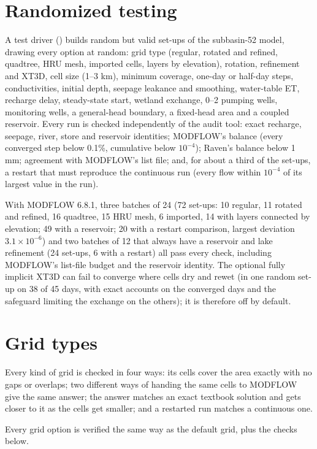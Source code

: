 \section{Randomized testing}\label{sec:fuzz}
A test driver () builds random but valid set-ups of the subbasin-52 model, drawing every option
at random: grid type (regular, rotated and refined, quadtree, HRU mesh, imported cells, layers by elevation), rotation,
refinement and XT3D, cell size (1--3 km), minimum coverage, one-day or half-day steps, conductivities, initial depth,
seepage leakance and smoothing, water-table ET, recharge delay, steady-state start, wetland exchange, 0--2 pumping wells,
monitoring wells, a general-head boundary, a fixed-head area and a coupled reservoir. Every run is checked independently of
the audit tool: exact recharge, seepage, river, store and reservoir identities; MODFLOW's balance (every converged step
below 0.1\%, cumulative below $10^{-4}$); Raven's balance below 1 mm; agreement with MODFLOW's list file; and, for about a
third of the set-ups, a restart that must reproduce the continuous run (every flow within $10^{-4}$ of its largest value in
the run).

With MODFLOW 6.8.1, three batches of 24 (72 set-ups: 10 regular, 11 rotated and refined, 16 quadtree, 15 HRU mesh,
6 imported, 14 with layers connected by elevation; 49 with a reservoir; 20 with a restart comparison, largest deviation
$3.1\times10^{-6}$) and two batches of 12 that always have a reservoir and lake refinement (24 set-ups, 6 with a restart) all
pass every check, including MODFLOW's list-file budget and the reservoir identity. The optional fully implicit XT3D can
fail to converge where cells dry and rewet (in one random set-up on 38 of 45 days, with exact accounts on the converged
days and the safeguard limiting the exchange on the others); it is therefore off by default.

\section{Grid types}\label{sec:vgrids}
\begin{plain}
Every kind of grid is checked in four ways: its cells cover the area exactly with no gaps or overlaps; two different ways of
handing the same cells to MODFLOW give the same answer; the answer matches an exact textbook solution and gets closer to it
as the cells get smaller; and a restarted run matches a continuous one.
\end{plain}
Every grid option is verified the same way as the default grid, plus the checks below.

